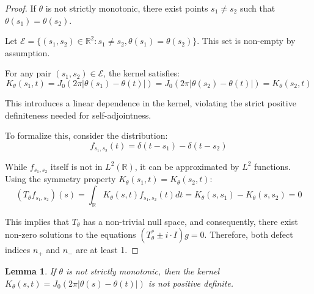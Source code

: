 \documentclass{article}
\newtheorem{lemma}[theorem]{Lemma}
\begin{document}
\begin{proof}
If $\theta$ is not strictly monotonic, there exist points $s_1 \neq s_2$ such that $\theta(s_1) = \theta(s_2)$.

Let $\mathcal{E} = \{(s_1,s_2) \in \mathbb{R}^2 : s_1 \neq s_2, \theta(s_1) = \theta(s_2)\}$. This set is non-empty by assumption.

For any pair $(s_1,s_2) \in \mathcal{E}$, the kernel satisfies:
\begin{equation}
    K_\theta(s_1,t) = J_0(2\pi|\theta(s_1) - \theta(t)|) = J_0(2\pi|\theta(s_2) - \theta(t)|) = K_\theta(s_2,t)
\end{equation}

This introduces a linear dependence in the kernel, violating the strict positive definiteness needed for self-adjointness.

To formalize this, consider the distribution:
\begin{equation}
    f_{s_1,s_2}(t) = \delta(t-s_1) - \delta(t-s_2)
\end{equation}

While $f_{s_1,s_2}$ itself is not in $L^2(\mathbb{R})$, it can be approximated by $L^2$ functions. Using the symmetry property $K_\theta(s_1,t) = K_\theta(s_2,t)$:
\begin{equation}
    (T_\theta f_{s_1,s_2})(s) = \int_{\mathbb{R}} K_\theta(s,t)f_{s_1,s_2}(t)dt = K_\theta(s,s_1) - K_\theta(s,s_2) = 0
\end{equation}

This implies that $T_\theta$ has a non-trivial null space, and consequently, there exist non-zero solutions to the equations $(T_\theta^* \pm i\cdot I)g = 0$. Therefore, both defect indices $n_+$ and $n_-$ are at least 1.
\end{proof}

\begin{lemma}\label{lemma:nonmonotonic-not-pd}
If $\theta$ is not strictly monotonic, then the kernel $K_\theta(s,t) = J_0(2\pi|\theta(s) - \theta(t)|)$ is not positive definite.
\end{lemma}
\end{document}
